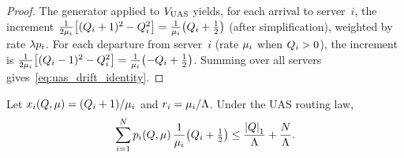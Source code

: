 \begin{proof}
The generator applied to $V_{\mathrm{UAS}}$ yields, for each arrival to server~$i$, the increment $\frac{1}{2\mu_i}\bigl[(Q_{i}+1)^2 - Q_{i}^2\bigr] = \frac{1}{\mu_i}\bigl(Q_{i}+\tfrac{1}{2}\bigr)$ (after simplification), weighted by rate $\lambda p_{i}$. For each departure from server~$i$ (rate $\mu_i$ when $Q_{i}>0$), the increment is $\frac{1}{2\mu_i}\bigl[(Q_{i}-1)^2 - Q_{i}^2\bigr] = \frac{1}{\mu_i}\bigl(-Q_{i}+\tfrac{1}{2}\bigr)$. Summing over all servers gives~\eqref{eq:uas_drift_identity}.
\end{proof}

\begin{lemma}
\label{lem:uas_arrival}
Let $x_{i}(Q, \mu) = (Q_{i}+1)/\mu_i$ and $r_{i} = \mu_i/\Lambda$. Under the UAS routing law,
\begin{equation}
\label{eq:uas_arrival_bound}
\sum_{i=1}^{N} p_{i}(Q, \mu)\,\frac{1}{\mu_i}\bigl(Q_{i}+\tfrac{1}{2}\bigr)
\leq \frac{\left\lvert Q \right\rvert_1}{\Lambda} + \frac{N}{\Lambda}.
\end{equation}
\end{lemma}

